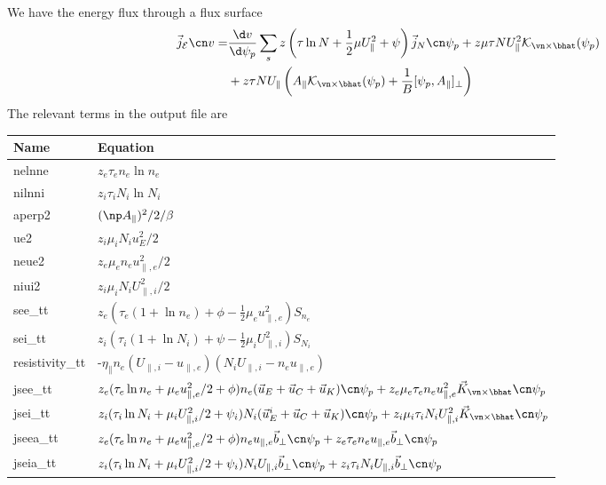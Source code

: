 We have the energy flux through a flux surface
\begin{align}
 \vec j_{\mathcal E}\cn v =&%
\frac{\d v}{\d \psi_p}\sum_s z\left (\tau\ln N + \frac{1}{2}\mu U_\parallel^2 + \psi\right) \vec j_N\cn\psi_p
+ z \mu\tau NU_\parallel^2 \mathcal K_{\vn\times\bhat}(\psi_p) \nonumber\\
&+ z \tau NU_\parallel
 \left( A_\parallel \mathcal
 K_{\vn\times\bhat}(\psi_p) + \frac{1}{B}[\psi_p, A_\parallel]_\perp\right)
\label{eq:energy_flux}
\end{align}
The relevant terms in the output file are
\begin{longtable}{ll}
\toprule
\rowcolor{gray!50}\textbf{Name} &  \textbf{Equation}\\
\midrule
    nelnne &$ z_e\tau_e n_e \ln n_e$ \\
    nilnni &$ z_i\tau_i N_i \ln N_i$ \\
    aperp2 &$ (\np A_\parallel)^2/2/\beta$ \\
    ue2   &$z_i\mu_i N_i u_E^2 /2$ \\
    neue2 &$ z_e\mu_e n_e u_{\parallel,e}^2/2$ \\
    niui2 &$ z_i\mu_i N_i U_{\parallel,i}^2/2$ \\
    see\_tt & $z_e(\tau_e (1+\ln n_e) + \phi - \frac{1}{2}\mu_e u_{\parallel,e}^2) S_{n_e} $ \\
    sei\_tt & $z_i(\tau_i (1+\ln N_i) + \psi - \frac{1}{2}\mu_i U_{\parallel,i}^2) S_{N_i} $ \\
    resistivity\_tt &-$\eta_\parallel n_e (U_{\parallel,i}-u_{\parallel,e})(N_iU_{\parallel,i}-n_eu_{\parallel,e})$ \\
    jsee\_tt &$z_e(\tau_e \ln n_e + \mu_e u_{\parallel,e}^2/2 + \phi)n_e(\vec u_E + \vec u_C + \vec u_K)\cn \psi_p
        + z_e \mu_e\tau_e n_e u_{\parallel,e}^2 \vec K_{\vn\times\bhat}\cn \psi_p$ \\
    jsei\_tt &$z_i(\tau_i \ln N_i + \mu_i U_{\parallel,i}^2/2 + \psi_i)N_i(\vec u_E^i + \vec u_C + \vec u_K)\cn \psi_p
        + z_i \mu_i\tau_i N_i U_{\parallel,i}^2 \vec K_{\vn\times\bhat}\cn \psi_p$ \\
    jseea\_tt &$z_e(\tau_e \ln n_e + \mu_e u_{\parallel,e}^2/2 + \phi)n_e u_{\parallel,e}\vec { b}_\perp\cn \psi_p
        + z_e \tau_e n_e u_{\parallel,e} \vec{ b}_\perp \cn \psi_p $ \\
    jseia\_tt &$z_i(\tau_i \ln N_i + \mu_i U_{\parallel,i}^2/2 + \psi_i)N_i U_{\parallel,i}\vec { b}_\perp\cn \psi_p
        + z_i \tau_i N_i U_{\parallel,i} \vec{ b}_\perp \cn \psi_p $ \\

\end{longtable}
